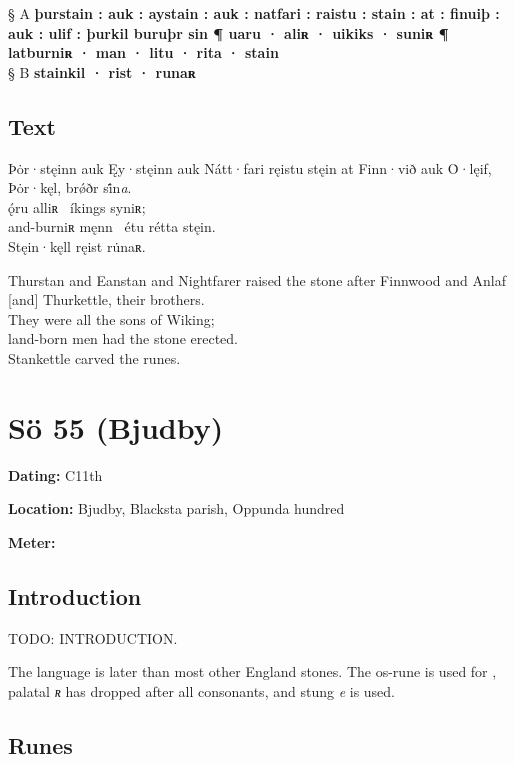 § A \textbf{þurstain : auk : aystain : auk : natfari : raistu : stain : at : finuiþ : auk : ulif : þurkil buruþr sin ¶ uaru · aliʀ · uikiks · suniʀ ¶ latburniʀ · man · litu · rita · stain} \\
§ B \textbf{stainkil · rist · runaʀ}

\subsection{Text}

\bpg\bpa[0]%
\startsub Þȯr·stęinn auk Ęy·stęinn auk Nátt·fari ręistu stęin at Finn·við auk Ȯ·lęif, Þȯr·kęl, brǿðr si̇́n\emph{a}.\endsub \\
ǫ́ru alliʀ \hld\ íkings syniʀ; \\
and-burniʀ męnn \hld\ étu rétta stęin. \\
Stęin·kęll ręist ru̇naʀ. \epa

\bpb Thurstan and Eanstan and Nightfarer raised the stone after Finnwood and Anlaf [and] Thurkettle, their brothers. \\
They were all the sons of Wiking; \\
land-born men had the stone erected. \\
Stankettle carved the runes.\epb\epg

\sectionline\clearpage


\section{Sö 55 (Bjudby)}

\begin{flushright}%
\textbf{Dating:} C11th

\textbf{Location:} Bjudby, Blacksta parish, Oppunda hundred

\textbf{Meter:} \Fornyrdislag
\end{flushright}%

\subsection{Introduction}

TODO: INTRODUCTION.

The language is later than most other England stones.  The os-rune is used for , palatal \emph{ʀ} has dropped after all consonants, and stung \emph{e} is used.

\subsection{Runes}

